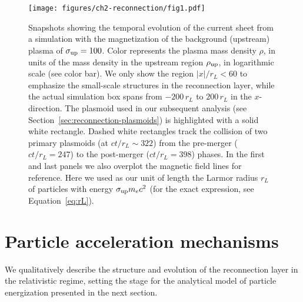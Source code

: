 \label{sec:reconnection-qualitative}
\begin{figure}[!ht]
    \centering
    \texttt{[image: figures/ch2-reconnection/fig1.pdf]}
    \caption{Snapshots showing the temporal evolution of the current sheet from a simulation with the magnetization of the background (upstream) plasma of $\sigma_{\rm up}=100$. Color represents the plasma mass density $\rho$, in units of the mass density in the upstream region $\rho_{\rm up}$, in logarithmic scale (see color bar). We only show the region $|x| / r_L < 60$ to emphasize the small-scale structures in the reconnection layer, while the actual simulation box spans from $-200\, r_L$ to $200 \, r_L$ in the $x$-direction.  The plasmoid used in our subsequent analysis (see Section~\ref{sec:reconnection-plasmoids}) is highlighted with a solid white rectangle. Dashed white rectangles track the collision of two primary plasmoids (at $ct/r_L\sim322$) from the pre-merger ($ct/r_L=247$) to the post-merger ($ct/r_L=398$) phases. In the first and last panels we also overplot the magnetic field lines for reference. Here we used as our unit of length the Larmor radius $r_L$ of particles with energy $\sigma_{\rm up} m_e c^2$ (for the exact expression, see Equation~\eqref{eq:rL}).}
    \label{fig:rec-evolution}
\end{figure}

\section{Particle acceleration mechanisms}

We qualitatively describe the structure and evolution of the reconnection layer in the relativistic regime, setting the stage for the analytical model of particle energization presented in the next section.

